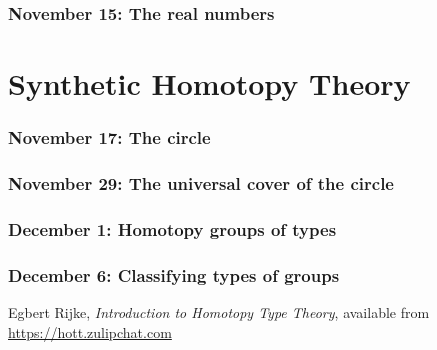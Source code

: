 \documentclass{amsart}
\theoremstyle{theorem}
\theoremstyle{definition}
\theoremstyle{remark}
\newcommand{\0}{\mathbbe{0}}
\newcommand{\1}{\mathbbe{1}}
\newcommand{\2}{\mathbbe{2}}
\newcommand{\3}{\mathbbe{3}}
\newcommand{\4}{\mathbbe{4}}
\begin{document}
\section*{November 15: The real numbers}


\part{Synthetic Homotopy Theory}

\section*{November 17: The circle}
\section*{November 29: The universal cover of the circle}
\section*{December 1: Homotopy groups of types}
\section*{December 6: Classifying types of groups}


\begin{thebibliography}{R}

 Egbert Rijke, \emph{Introduction to Homotopy Type Theory}, available from \url{https://hott.zulipchat.com}

\end{thebibliography}
\end{document}
